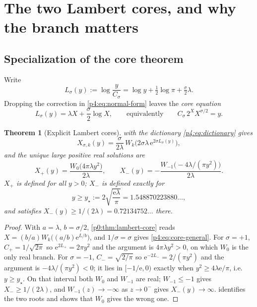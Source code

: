 \documentclass[11pt,a4paper,oneside]{book}
\theoremstyle{plain}
\newtheorem{theorem}{Theorem}[chapter]
\theoremstyle{definition}
\theoremstyle{remark}
\newcommand{\e}{\mathrm{e}}
\newcommand{\Wlam}{W}
\newcommand{\Xcore}{X}
\begin{document}
\section{The two Lambert cores, and why the branch matters}
\label{p4:sec:lambert}

\subsection{Specialization of the core theorem}

Write
\begin{equation}
  L_\sigma(y):=\log\frac{y}{C_\sigma}
   =\log y+\tfrac12\log\pi+\tfrac\sigma2\lambda .
  \label{p4:eq:L-def}
\end{equation}
Dropping the correction in \cref{p4:eq:normal-form} leaves the \emph{core
equation}
\begin{equation}
  L_\sigma(y)=\lambda \Xcore+\frac\sigma2\log \Xcore,
  \qquad\text{equivalently}\qquad
  C_\sigma\,2^{\Xcore}\Xcore^{\sigma/2}=y .
  \label{p4:eq:core-equation}
\end{equation}

\begin{theorem}[Explicit Lambert cores]
\label{p4:thm:cores}
 with the dictionary \cref{p4:eq:dictionary} gives
\begin{equation}
  \Xcore_{\sigma,k}(y)=\frac{\sigma}{2\lambda}\,
  \Wlam_k\!\bigl(2\sigma\lambda\,\e^{2\sigma L_\sigma(y)}\bigr),
  \label{p4:eq:core-general}
\end{equation}
and the unique large positive real solutions are
\begin{equation}
  \boxed{\;
  \Xcore_+(y)=\frac{\Wlam_0\!\bigl(4\pi\lambda y^{2}\bigr)}{2\lambda},
  \qquad
  \Xcore_-(y)=-\frac{\Wlam_{-1}\!\bigl(-4\lambda/(\pi y^{2})\bigr)}{2\lambda}.
  \;}
  \label{p4:eq:cores}
\end{equation}
$\Xcore_+$ is defined for all $y>0$; $\Xcore_-$ is defined exactly for
\begin{equation}
  y\ge y_\star:=2\sqrt{\frac{\e\lambda}{\pi}}=1.548870223880\ldots,
  \label{p4:eq:ystar}
\end{equation}
and satisfies $\Xcore_-(y)\ge1/(2\lambda)=0.72134752\ldots$ there.
\end{theorem}

\begin{proof}
With $a=\lambda$, $b=\sigma/2$, \cref{p0:thm:lambert-core} reads
$\Xcore=(b/a)\Wlam_k\bigl((a/b)\e^{L/b}\bigr)$, and $1/\sigma=\sigma$ gives
\cref{p4:eq:core-general}.  For $\sigma=+1$, $C_+=1/\sqrt{2\pi}$ so
$\e^{2L_+}=2\pi y^{2}$ and the argument is $4\pi\lambda y^{2}>0$, on which
$\Wlam_0$ is the only real branch.  For $\sigma=-1$, $C_-=\sqrt{2/\pi}$ so
$\e^{-2L_-}=2/(\pi y^{2})$ and the argument is $-4\lambda/(\pi y^{2})<0$;
it lies in $[-1/\e,0)$ exactly when $y^{2}\ge4\lambda\e/\pi$, i.e.\
$y\ge y_\star$.  On that interval both $\Wlam_0$ and $\Wlam_{-1}$ are real;
$\Wlam_{-1}\le-1$ gives $\Xcore_-\ge1/(2\lambda)$, and
$\Wlam_{-1}(z)\to-\infty$ as $z\to0^-$ gives $\Xcore_-(y)\to\infty$.
\Cref{p4:prop:two-roots} identifies the two roots and shows that $\Wlam_0$
gives the wrong one.
\end{proof}
\end{document}
